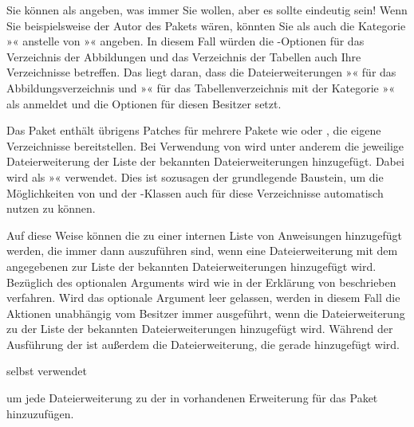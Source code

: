 Sie können als  angeben, was immer Sie wollen, aber es sollte
eindeutig sein! Wenn Sie beispielsweise der Autor des Pakets 
wären, könnten Sie als  auch die Kategorie »«
anstelle von »« angeben. In diesem Fall würden die
\KOMAScript-Optionen%
 für das Verzeichnis der Abbildungen
und das Verzeichnis der Tabellen auch Ihre Verzeichnisse betreffen. Das liegt
daran, dass \KOMAScript{} die Dateierweiterungen »« für das
Abbildungsverzeichnis und »« für das Tabellenverzeichnis mit der
Kategorie »« als  anmeldet und die Optionen für
diesen Besitzer setzt.

Das Paket \hyperref[cha:scrhack]{}%
 enthält übrigens
Patches für mehrere Pakete wie  oder
, die eigene Verzeichnisse
bereitstellen. Bei Verwendung von \hyperref[cha:scrhack]{}
wird unter anderem die jeweilige Dateierweiterung der Liste der bekannten
Dateierweiterungen hinzugefügt. Dabei wird als 
»« verwendet. Dies ist sozusagen der grundlegende Baustein, um
die Möglichkeiten von  und der \KOMAScript-Klassen auch für
diese Verzeichnisse automatisch nutzen zu können.%
\EndIndexGroup


\begin{Declaration}
\end{Declaration}
Auf diese Weise können die  zu einer internen Liste von
Anweisungen hinzugefügt werden, die immer dann auszuführen sind, wenn eine
Dateierweiterung mit dem angegebenen  zur Liste der bekannten
Dateierweiterungen hinzugefügt wird. Bezüglich des optionalen Arguments wird
wie in der Erklärung von  beschrieben
verfahren. Wird das optionale Argument leer gelassen, werden in diesem Fall
die Aktionen unabhängig vom Besitzer immer ausgeführt, wenn die
Dateierweiterung zu der Liste der bekannten Dateierweiterungen hinzugefügt
wird. Während der Ausführung der  ist außerdem
 die
Dateierweiterung, die gerade hinzugefügt wird.
\begin{Example}
   selbst verwendet
\begin{lstcode}
  \AtAddToTocList[]{%
    \expandafter\tocbasic@extend@babel
    \expandafter{\@currext}}
\end{lstcode}
  um jede Dateierweiterung zu der in  vorhandenen
  Erweiterung für das Paket  hinzuzufügen. 
\end{Example}

